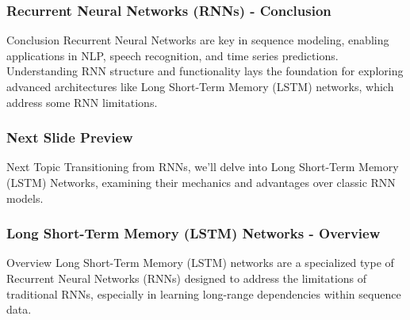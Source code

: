 \documentclass{beamer}
\begin{document}
\begin{frame}[fragile]
    \frametitle{Recurrent Neural Networks (RNNs) - Conclusion}
    \begin{block}{Conclusion}
        Recurrent Neural Networks are key in sequence modeling, enabling applications in NLP, speech recognition, and time series predictions. Understanding RNN structure and functionality lays the foundation for exploring advanced architectures like Long Short-Term Memory (LSTM) networks, which address some RNN limitations.
    \end{block}
\end{frame}

\begin{frame}[fragile]
    \frametitle{Next Slide Preview}
    \begin{block}{Next Topic}
        Transitioning from RNNs, we'll delve into Long Short-Term Memory (LSTM) Networks, examining their mechanics and advantages over classic RNN models.
    \end{block}
\end{frame}

\begin{frame}[fragile]
    \frametitle{Long Short-Term Memory (LSTM) Networks - Overview}
    \begin{block}{Overview}
        Long Short-Term Memory (LSTM) networks are a specialized type of Recurrent Neural Networks (RNNs) designed to address the limitations of traditional RNNs, especially in learning long-range dependencies within sequence data.
    \end{block}
\end{frame}
\end{document}
